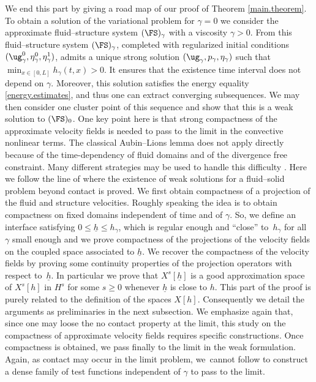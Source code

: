 We end this part by giving a road map of our proof of Theorem \ref{main.theorem}.
To obtain a solution of the variational problem for $\gamma=0$ we consider the approximate fluid--structure system $(\FS)_{\gamma}$ with a viscosity $\gamma>0$. From \cite[Th.\,1]{Grandmont-Hillairet-Lequeurre} this fluid--structure system $(\FS)_{\gamma}$, completed with regularized initial conditions $(\ug^{0}_{\gamma},\eta^{0}_{\gamma},\eta^{1}_{\gamma})$, admits a unique strong solution $(\ug_{\gamma},p_{\gamma},\eta_{\gamma})$ such that $\min_{x\in [0, L]}h_\gamma(t, x)>0$. It ensures that the existence time interval does not depend on $\gamma$. Moreover, this solution satisfies the energy equality \eqref{energy.estimates}, and thus one can extract converging subsequences. 
We may then consider one cluster point of this sequence and show that this is a weak solution to $(\FS)_0$.
One key point here is that strong compactness of the approximate velocity fields is needed to pass to the limit in the convective nonlinear terms. The classical Aubin--Lions lemma does not apply directly because of the time-dependency of fluid domains and of the divergence free constraint. Many different strategies may be used to handle this difficulty \cite{Fujita-Sauer, Grandmont08, Lengeler, Moussa}. Here we follow the line of \cite{SanMartin-Starovoitov-Tucsnak} where the existence of weak solutions for a fluid--solid problem beyond contact is proved. We first obtain compactness of a projection of the fluid and structure velocities. Roughly speaking the idea is to obtain compactness on fixed domains independent of time and of $\gamma$. So, we define an interface satisfying $0\leq\underline{h}\leq h_\gamma$, which is regular enough and ``close'' to~$h_\gamma$ for all $\gamma$ small enough
and we prove compactness of the projections of the velocity fields on the coupled space associated to $\underline{h}$. We recover the
compactness of the velocity fields by proving some continuity properties of the projection operators with respect to~$\underline{h}$. {In particular we prove that $X^{s}[\underline{h}]$ is a good approximation space of $X^{s}[h]$ in $H^s$ for some $s\geq 0$ whenever $\underline{h}$ is close to $h$.}
This part of the proof is purely related to the definition of the spaces $X[h]$. Consequently we detail the arguments as preliminaries in the next subsection. We emphasize again that, since one may loose the no contact property at the limit, this study on the compactness of approximate velocity fields requires specific constructions. Once compactness is obtained, we pass finally to the limit in the weak formulation. Again, as contact may occur in the limit problem, we~cannot follow \cite{Chambolle-etal} to construct a dense family of test functions independent of $\gamma$ to pass to the limit.


